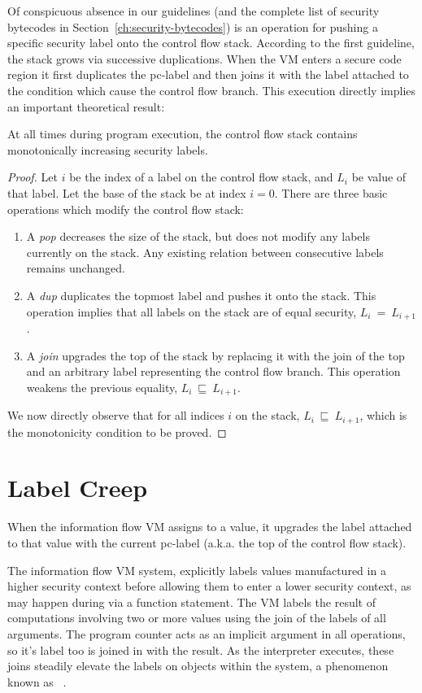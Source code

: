 Of conspicuous absence in our guidelines (and the complete list of security bytecodes in Section~\ref{ch:security-bytecodes}) is an operation for pushing a specific security label onto the control flow stack.
According to the first guideline, the stack grows via successive duplications.
When the VM enters a secure code region it first duplicates the pc-label and then joins it with the label attached to the condition which cause the control flow branch.
This execution directly implies an important theoretical result:
\begin{theorem}
  At all times during program execution, the control flow stack contains monotonically increasing security labels.
\end{theorem}
\begin{proof}
 Let $i$ be the index of a label on the control flow stack, and $L_i$ be value of that label.
 Let the base of the stack be at index $i=0$.
 There are three basic operations which modify the control flow stack:
 \begin{enumerate}
  \item A \textit{pop} decreases the size of the stack, but does not modify any labels currently on the stack. Any existing relation between consecutive labels remains unchanged.
  \item A \textit{dup} duplicates the topmost label and pushes it onto the stack. This operation implies that all labels on the stack are of equal security, $L_i~=~L_{i+1}$.
  \item A \textit{join} upgrades the top of the stack by replacing it with the join of the top and an arbitrary label representing the control flow branch. This operation weakens the previous equality, $L_i~\sqsubseteq~L_{i+1}$.
 \end{enumerate}
 We now directly observe that for all indices $i$ on the stack, $L_i~\sqsubseteq~L_{i+1}$, which is the monotonicity condition to be proved.
\end{proof}

\section{Label Creep}
When the information flow VM assigns to a value, it upgrades the label attached to that value with the current pc-label (a.k.a. the top of the control flow stack).

The information flow VM system, explicitly labels values manufactured in a higher security context before allowing them to enter a lower security context, as may happen during via a function  statement.
The VM labels the result of computations involving two or more values using the join of the labels of all arguments.
The program counter acts as an implicit argument in all operations, so it's label too is joined in with the result.
As the interpreter executes, these joins steadily elevate the labels on objects within the system, a phenomenon known as ~\cite{sabelfeld.myers+03}.

